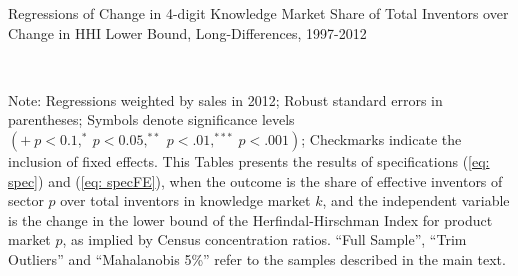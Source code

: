 \begin{table}
\caption{Regressions of Change in 4-digit Knowledge Market Share of Total Inventors
over Change in HHI Lower Bound, Long-Differences, 1997-2012\label{tab: RegShInvHHI-1}}

\begin{centering}
\par\end{centering}

\begin{centering}
\\
\par\end{centering}
\raggedright{}{\small{}Note: Regressions weighted by sales in 2012;
Robust standard errors in parentheses; Symbols denote significance
levels $\left(+\ p<0.1,^{*}\ p<0.05,^{**}\ p<.01,^{***}\ p<.001\right)$;
Checkmarks indicate the inclusion of fixed effects. This Tables presents
the results of specifications (\ref{eq: spec}) and (\ref{eq: specFE}),
when the outcome is the share of effective inventors of sector $p$
over total inventors in knowledge market $k$, and the independent
variable is the change in the lower bound of the Herfindal-Hirschman
Index for product market $p$, as implied by Census concentration
ratios. ``Full Sample'', ``Trim Outliers'' and ``Mahalanobis
5\%'' refer to the samples described in the main text.}{\small\par}
\end{table}

